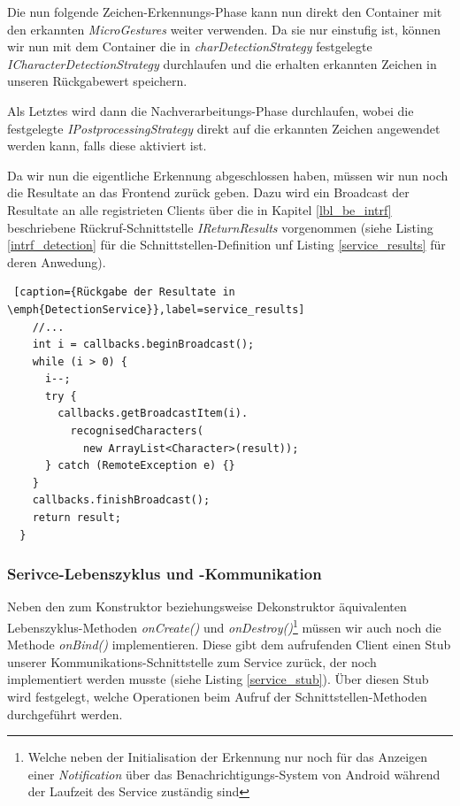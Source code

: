 Die nun folgende Zeichen-Erkennungs-Phase kann nun direkt den Container mit den erkannten \emph{MicroGestures} weiter verwenden. Da sie nur einstufig ist, können wir nun mit dem Container die in \emph{charDetectionStrategy} festgelegte \emph{ICharacterDetectionStrategy} durchlaufen und die erhalten erkannten Zeichen in unseren Rückgabewert speichern.

Als Letztes wird dann die Nachverarbeitungs-Phase durchlaufen, wobei die festgelegte \emph{IPostprocessingStrategy} direkt auf die erkannten Zeichen angewendet werden kann, falls diese aktiviert ist.

Da wir nun die eigentliche Erkennung abgeschlossen haben, müssen wir nun noch die Resultate an das Frontend zurück geben. Dazu wird ein Broadcast der Resultate an alle registrieten Clients über die in Kapitel \ref{lbl_be_intrf} beschriebene Rückruf-Schnittstelle \emph{IReturnResults} vorgenommen (siehe Listing \ref{intrf_detection} für die Schnittstellen-Definition unf Listing \ref{service_results} für deren Anwedung).

\begin{lstlisting} [caption={Rückgabe der Resultate in \emph{DetectionService}},label=service_results]
    //...
    int i = callbacks.beginBroadcast();
    while (i > 0) {
      i--;
      try {
        callbacks.getBroadcastItem(i).
          recognisedCharacters(
            new ArrayList<Character>(result));
      } catch (RemoteException e) {}
    }
    callbacks.finishBroadcast();
    return result;
  }
\end{lstlisting}

\subsubsection{Serivce-Lebenszyklus und -Kommunikation}

Neben den zum Konstruktor beziehungsweise Dekonstruktor äquivalenten Lebenszyklus-Methoden \emph{onCreate()} und \emph{onDestroy()}\footnote{Welche neben der Initialisation der Erkennung nur noch für das Anzeigen einer \emph{Notification} über das Benachrichtigungs-System von Android während der Laufzeit des Service zuständig sind} müssen wir auch noch die Methode \emph{onBind()} implementieren. Diese gibt dem aufrufenden Client einen Stub unserer Kommunikations-Schnittstelle zum Service zurück, der noch implementiert werden musste (siehe Listing \ref{service_stub}). Über diesen Stub wird festgelegt, welche Operationen beim Aufruf der Schnittstellen-Methoden durchgeführt werden.

